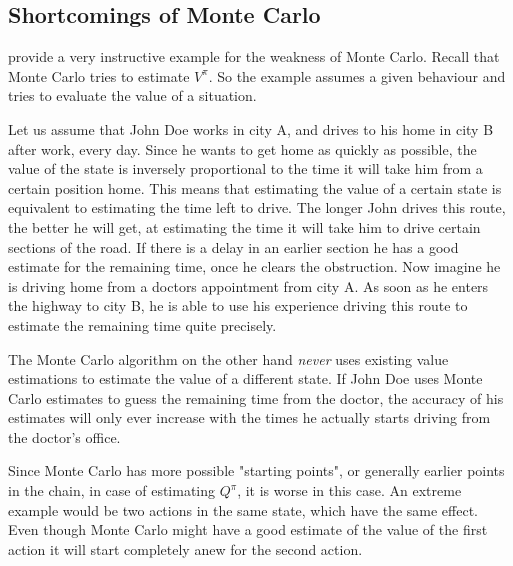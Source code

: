 \subsection{Shortcomings of Monte Carlo}
\citeauthor{suttonReinforcementLearningIntroduction1998} provide a very instructive example for the weakness of Monte Carlo. Recall that Monte Carlo tries to estimate \(V^\pi\). So the example assumes a given behaviour and tries to evaluate the value of a situation.

\begin{example}\label{driving home}
	Let us assume that John Doe works in city A, and drives to his home in city B after work, every day. Since he wants to get home as quickly as possible, the value of the state is inversely proportional to the time it will take him from a certain position home. This means that estimating the value of a certain state is equivalent to estimating the time left to drive. The longer John drives this route, the better he will get, at estimating the time it will take him to drive certain sections of the road. If there is a delay in an earlier section he has a good estimate for the remaining time, once he clears the obstruction. Now imagine he is driving home from a doctors appointment from city A. As soon as he enters the highway to city B, he is able to use his experience driving this route to estimate the remaining time quite precisely.

	The Monte Carlo algorithm on the other hand \emph{never} uses existing value estimations to estimate the value of a different state. If John Doe uses Monte Carlo estimates to guess the remaining time from the doctor, the accuracy of his estimates will only ever increase with the times he actually starts driving from the doctor's office. 
\end{example}

Since Monte Carlo has more possible "starting points", or generally earlier points in the chain, in case of estimating \(Q^\pi\), it is worse in this case. An extreme example would be two actions in the same state, which have the same effect. Even though Monte Carlo might have a good estimate of the value of the first action it will start completely anew for the second action. 

